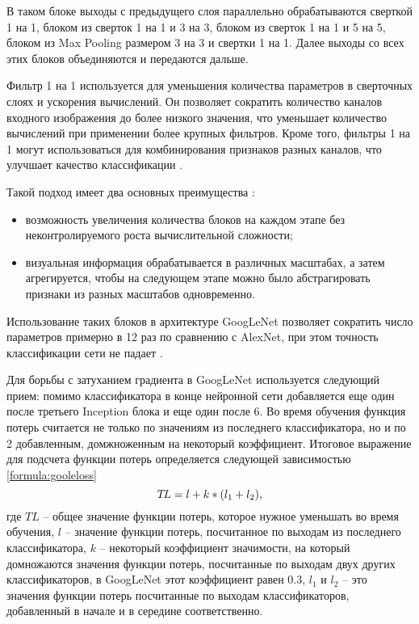 В таком блоке выходы с предыдущего слоя параллельно обрабатываются сверткой 1 на 1, блоком из сверток 1 на 1 и 3 на 3, блоком из сверток 1 на 1 и 5 на 5, блоком из Max Pooling размером 3 на 3 и свертки 1 на 1. Далее выходы со всех этих блоков объединяются и передаются дальше.

Фильтр 1 на 1 используется для уменьшения количества параметров в сверточных слоях и ускорения вычислений. Он позволяет сократить количество каналов входного изображения до более низкого значения, что уменьшает количество вычислений при применении более крупных фильтров. Кроме того, фильтры 1 на 1 могут использоваться для комбинирования признаков разных каналов, что улучшает качество классификации \cite{googlenet}.

Такой подход имеет два основных преимущества \cite{googlenet}:
\begin{itemize}
	\item возможность увеличения количества блоков на каждом этапе без неконтролируемого роста вычислительной сложности;
	\item визуальная информация обрабатывается в различных масштабах, а затем агрегируется, чтобы на следующем этапе можно было абстрагировать признаки из разных масштабов одновременно.
\end{itemize}

Использование таких блоков в архитектуре GoogLeNet позволяет сократить число параметров примерно в 12 раз по сравнению с AlexNet, при этом точность классификации сети не падает \cite{googlenet}.

Для борьбы с затуханием градиента в GoogLeNet используется следующий прием: помимо классификатора в конце нейронной сети добавляется еще один после третьего Inception блока и еще один после 6. Во время обучения функция потерь считается не только по значениям из последнего классификатора, но и по 2 добавленным, домжноженным на некоторый коэффициент. Итоговое выражение для подсчета функции потерь определяется следующей зависимостью \ref{formula:gooleloss}
\begin{equation}\label{formula:gooleloss}
T\!L = l + k * (l_{\rm{1}} + l_{\rm{2}}),
\end{equation}
где $T\!L$ -- общее значение функции потерь, которое нужное уменьшать во время обучения, $l$ -- значение функции потерь, посчитанное по выходам из последнего классификатора, $k$ -- некоторый коэффициент значимости, на который домножаются значения функции потерь, посчитанные по выходам двух других классификаторов, в GoogLeNet этот коэффициент равен 0.3, $l_1$ и $l_2$ -- это значения функции потерь посчитанные по выходам классификаторов, добавленный в начале и в середине соответственно.

